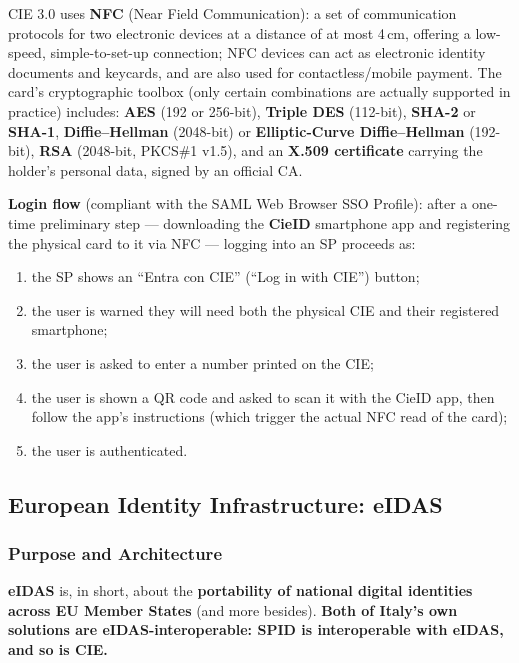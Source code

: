 \documentclass[12pt, a4paper]{article}
\begin{document}
CIE 3.0 uses \textbf{NFC} (Near Field Communication): a set of communication protocols for two electronic devices at a distance of at most 4\,cm, offering a low-speed, simple-to-set-up connection; NFC devices can act as electronic identity documents and keycards, and are also used for contactless/mobile payment. The card's cryptographic toolbox (only certain combinations are actually supported in practice) includes: \textbf{AES} (192 or 256-bit), \textbf{Triple DES} (112-bit), \textbf{SHA-2} or \textbf{SHA-1}, \textbf{Diffie--Hellman} (2048-bit) or \textbf{Elliptic-Curve Diffie--Hellman} (192-bit), \textbf{RSA} (2048-bit, PKCS\#1 v1.5), and an \textbf{X.509 certificate} carrying the holder's personal data, signed by an official CA.

\textbf{Login flow} (compliant with the SAML Web Browser SSO Profile): after a one-time preliminary step --- downloading the \textbf{CieID} smartphone app and registering the physical card to it via NFC --- logging into an SP proceeds as:
\begin{enumerate}
    \item the SP shows an ``Entra con CIE'' (``Log in with CIE'') button;
    \item the user is warned they will need both the physical CIE and their registered smartphone;
    \item the user is asked to enter a number printed on the CIE;
    \item the user is shown a QR code and asked to scan it with the CieID app, then follow the app's instructions (which trigger the actual NFC read of the card);
    \item the user is authenticated.
\end{enumerate}

\subsection{European Identity Infrastructure: eIDAS}
\label{subsec:eidas-06}

\subsubsection{Purpose and Architecture}
\textbf{eIDAS} is, in short, about the \textbf{portability of national digital identities across EU Member States} (and more besides). \textcolor{ForestGreen!60!black}{\textbf{Both of Italy's own solutions are eIDAS-interoperable: SPID is interoperable with eIDAS, and so is CIE.}}
\end{document}
